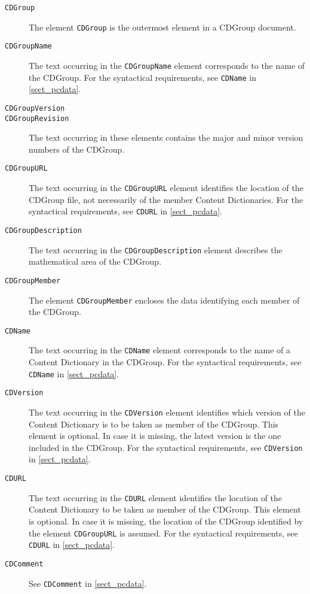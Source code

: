 \begin{description}
\item[\lstinline|CDGroup|] The \XML element \lstinline|CDGroup| is the outermost element
  in a CDGroup document.
\item[\lstinline|CDGroupName|] The text occurring in the \lstinline|CDGroupName| element
  corresponds to the name of the CDGroup. For the syntactical requirements, see
  \lstinline|CDName| in \ref{sect_pcdata}.
\item[\lstinline|CDGroupVersion|]
\item[\lstinline|CDGroupRevision|] The text occurring in these elements contains the
  major and minor version numbers of the CDGroup.
\item[\lstinline|CDGroupURL|] The text occurring in the \lstinline|CDGroupURL| element
  identifies the location of the CDGroup file, not necessarily of the member Content
  Dictionaries. For the syntactical requirements, see \lstinline|CDURL| in
  \ref{sect_pcdata}.
\item[\lstinline|CDGroupDescription|] The text occurring in the
  \lstinline|CDGroupDescription| element describes the mathematical area of the CDGroup.
\item[\lstinline|CDGroupMember|] The \XML element \lstinline|CDGroupMember| encloses the
  data identifying each member of the CDGroup.
\item[\lstinline|CDName|] The text occurring in the \lstinline|CDName| element
  corresponds to the name of a Content Dictionary in the CDGroup. For the syntactical
  requirements, see \lstinline|CDName| in \ref{sect_pcdata}.
\item[\lstinline|CDVersion|] The text occurring in the \lstinline|CDVersion| element
  identifies which version of the Content Dictionary is to be taken as member of the
  CDGroup. This element is optional. In case it is missing, the latest version is the one
  included in the CDGroup.  For the syntactical requirements, see \lstinline|CDVersion|
  in \ref{sect_pcdata}.
\item[\lstinline|CDURL|] The text occurring in the \lstinline|CDURL| element identifies
  the location of the Content Dictionary to be taken as member of the CDGroup. This
  element is optional. In case it is missing, the location of the CDGroup identified by
  the element \lstinline|CDGroupURL| is assumed.  For the syntactical requirements, see
  \lstinline|CDURL| in \ref{sect_pcdata}.
\item[\lstinline|CDComment|] See \lstinline|CDComment| in \ref{sect_pcdata}.
\end{description}

